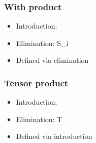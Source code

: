\documentclass{beamer}
\begin{document}
  \begin{frame}
    \frametitle{With product}
    \begin{itemize}
    \item Introduction:
                {\ctx{\Gamma}{\Delta} \vdash {} \ni {}}
    \item Elimination:
                {\ctx{\Gamma}{\Delta} \vdash {} \in S_i}
    \item Defined via elimination
    \end{itemize}
  \end{frame}
  \begin{frame}
    \frametitle{Tensor product}
    \begin{itemize}
    \item Introduction:
                {\ctx{\Gamma}{\Delta} \vdash {} \ni {}}
    \item Elimination:
                {\ctx{\Gamma}{\Delta} \vdash {} \in T}
    \item Defined via introduction
    \end{itemize}
  \end{frame}
\end{document}
